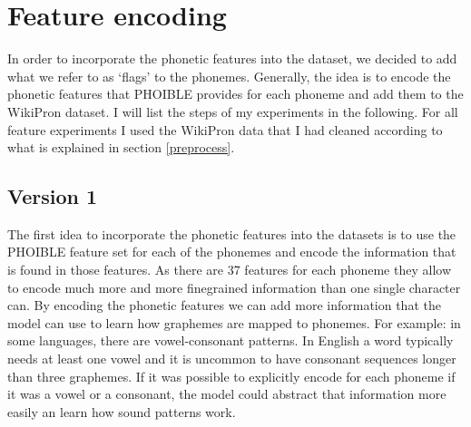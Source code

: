 \section{Feature encoding}
\label{sec:feature_enc}
In order to incorporate the phonetic features into the dataset, we decided to add what we refer to as `flags' to the phonemes. Generally, the idea is to encode the phonetic features that PHOIBLE provides for each phoneme and add them to the WikiPron dataset. I will list the steps of my experiments in the following. For all feature experiments I used the WikiPron data that I had cleaned according to what is explained in section \ref{preprocess}.

\subsection*{Version 1}

The first idea to incorporate the phonetic features into the datasets is to use the PHOIBLE feature set for each of the phonemes and encode the information that is found in those features. As there are 37 features for each phoneme they allow to encode much more and more finegrained information than one single character can. By encoding the phonetic features we can add more information that the model can use to learn how graphemes are mapped to phonemes. For example: in some languages, there are vowel-consonant patterns. In English a word typically needs at least one vowel and it is uncommon to have consonant sequences longer than three graphemes. If it was possible to explicitly encode for each phoneme if it was a vowel or a consonant, the model could abstract that information more easily an learn how sound patterns work. 

